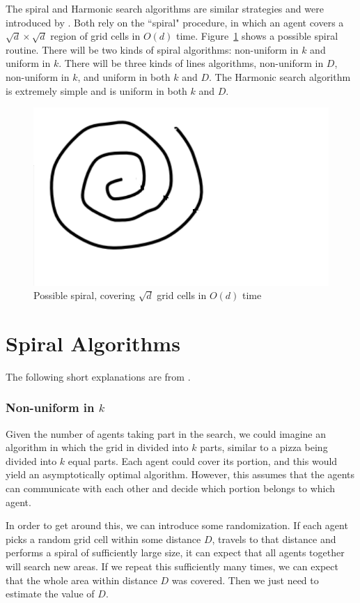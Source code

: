 \documentclass[runningheads,a4paper]{llncs}
\begin{document}
The spiral and Harmonic search algorithms are similar strategies and were introduced by \cite{feinerman2012collaborative}. Both rely on the ``spiral" procedure, in which an agent covers a $\sqrt{d} \times \sqrt{d}$ region of grid cells in $O(d)$ time. Figure~\ref{fig:spiral} shows a possible spiral routine.
There will be two kinds of spiral algorithms: non-uniform in $k$ and uniform in $k$. There will be three kinds of lines algorithms, non-uniform in $D$, non-uniform in $k$, and uniform in both $k$ and $D$. The Harmonic search algorithm is extremely simple and is uniform in both $k$ and $D$. 

\begin{figure}
\centering
\label{fig:spiral}
\includegraphics[width=0.4\linewidth]{justspiral.pdf}
\caption{Possible spiral, covering $\sqrt{d}$ grid cells in $O(d)$ time}
\end{figure}

\section{Spiral Algorithms}
\label{spiral}

The following short explanations are from \cite{feinerman2012collaborative}.

\subsubsection{Non-uniform in $k$}

Given the number of agents taking part in the search, we could imagine an algorithm in which the grid in divided into $k$ parts, similar to a pizza being divided into $k$ equal parts. Each agent could cover its portion, and this would yield an asymptotically optimal algorithm. However, this assumes that the agents can communicate with each other and decide which portion belongs to which agent. 

In order to get around this, we can introduce some randomization. If each agent picks a random grid cell within some distance $D$, travels to that distance and performs a spiral of sufficiently large size, it can expect that all agents together will search new areas. If we repeat this sufficiently many times, we can expect that the whole area within distance $D$ was covered. Then we just need to estimate the value of $D$.
\end{document}
